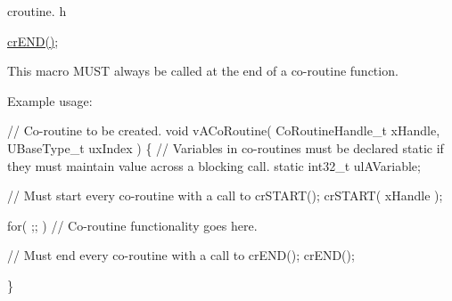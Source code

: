 croutine. h 
\begin{DoxyPre}
\hyperlink{vendor_2ceedling_2plugins_2freertos_2src_2freertos_2include_2croutine_8h_ae6038cc976689b50000475ebfc4e2f23}{crEND()};\end{DoxyPre}


This macro M\+U\+ST always be called at the end of a co-\/routine function.

Example usage\+: 
\begin{DoxyPre}
// Co-routine to be created.
void vACoRoutine( CoRoutineHandle\_t xHandle, UBaseType\_t uxIndex )
\{
// Variables in co-routines must be declared static if they must maintain value across a blocking call.
static int32\_t ulAVariable;
\begin{DoxyVerb}// Must start every co-routine with a call to crSTART();
crSTART( xHandle );

for( ;; )
{
     // Co-routine functionality goes here.
}

// Must end every co-routine with a call to crEND();
crEND();
\end{DoxyVerb}

\}\end{DoxyPre}
 